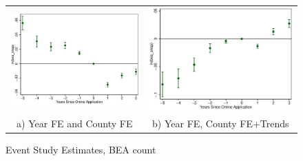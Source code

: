 \documentclass[11pt,letterpaper]{article}
\begin{document}
\begin{figure}\caption{Event Study Estimates, BEA count}
\begin{tabular}{cc}

\includegraphics[scale=0.57]{tabfig/evstu_bea_snap_one_yrcf_5_3}&\includegraphics[scale=0.57]{tabfig/evstu_bea_snap_one_yrcfsttr_5_3}\\
a) Year FE and County FE&b) Year FE, County FE+Trends\\

\end{tabular}
\end{figure}
\end{document}
